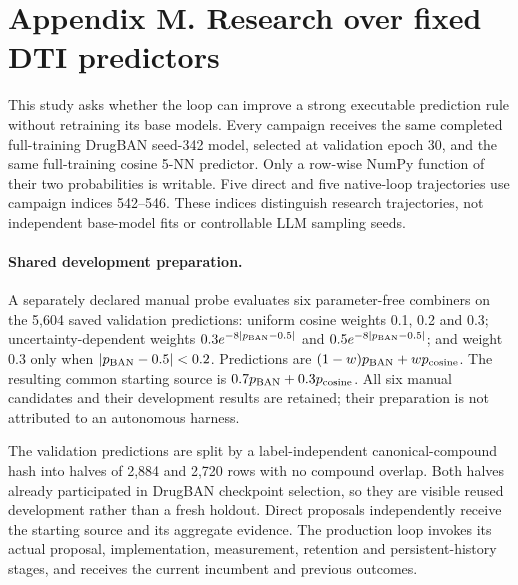 \section*{Appendix M. Research over fixed DTI predictors}
\renewcommand{\thetable}{M.\arabic{table}}
\renewcommand{\theHtable}{M.\arabic{table}}
\setcounter{table}{0}
This study asks whether the loop can improve a strong executable prediction rule without retraining its base models. Every campaign receives the same completed full-training DrugBAN seed-342 model, selected at validation epoch 30, and the same full-training cosine 5-NN predictor. Only a row-wise NumPy function of their two probabilities is writable. Five direct and five native-loop trajectories use campaign indices 542--546. These indices distinguish research trajectories, not independent base-model fits or controllable LLM sampling seeds.

\begin{table}[htbp]

\end{table}

\paragraph{Shared development preparation.}
A separately declared manual probe evaluates six parameter-free combiners on the 5,604 saved validation predictions: uniform cosine weights 0.1, 0.2 and 0.3; uncertainty-dependent weights $0.3e^{-8|p_{\rm BAN}-0.5|}$ and $0.5e^{-8|p_{\rm BAN}-0.5|}$; and weight 0.3 only when $|p_{\rm BAN}-0.5|<0.2$. Predictions are $(1-w)p_{\rm BAN}+wp_{\rm cosine}$. The resulting common starting source is $0.7p_{\rm BAN}+0.3p_{\rm cosine}$. All six manual candidates and their development results are retained; their preparation is not attributed to an autonomous harness.

The validation predictions are split by a label-independent canonical-compound hash into halves of 2,884 and 2,720 rows with no compound overlap. Both halves already participated in DrugBAN checkpoint selection, so they are visible reused development rather than a fresh holdout. Direct proposals independently receive the starting source and its aggregate evidence. The production loop invokes its actual proposal, implementation, measurement, retention and persistent-history stages, and receives the current incumbent and previous outcomes.

